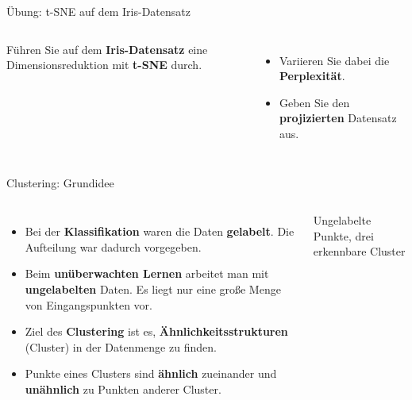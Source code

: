 \begin{frame}{Übung: t-SNE auf dem Iris-Datensatz}
\begin{columns}
Führen Sie auf dem \textbf{Iris-Datensatz} eine Dimensionsreduktion mit
\textbf{t-SNE} durch.

\vspace{0.4em}
\begin{itemize}
  \item Variieren Sie dabei die \textbf{Perplexität}.
  \item Geben Sie den \textbf{projizierten} Datensatz aus.
\end{itemize}

\centering
{}
\end{columns}
\end{frame}
\makequestionspage{\FRAGENIMAGE}



\begin{frame}{Clustering: Grundidee}
\begin{columns}
\begin{itemize}
  \item Bei der \textbf{Klassifikation} waren die Daten \textbf{gelabelt}.
        Die Aufteilung war dadurch vorgegeben.
  \item Beim \textbf{unüberwachten Lernen} arbeitet man mit
        \textbf{ungelabelten} Daten. Es liegt nur eine große Menge von
        Eingangspunkten vor.
  \item Ziel des \textbf{Clustering} ist es,
        \textbf{Ähnlichkeitsstrukturen} (Cluster) in der Datenmenge zu
        finden.
  \item Punkte eines Clusters sind \textbf{ähnlich} zueinander und
        \textbf{unähnlich} zu Punkten anderer Cluster.
\end{itemize}

\centering
{}

{\scriptsize Ungelabelte Punkte, drei erkennbare Cluster}
\end{columns}
\end{frame}


